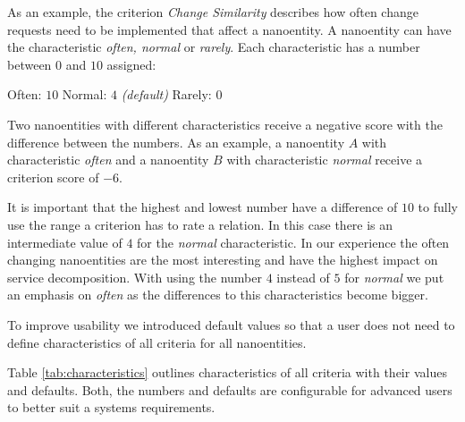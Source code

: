 As an example, the criterion \textit{Change Similarity} describes how often change requests need to be implemented that affect a nanoentity. A nanoentity can have the characteristic \textit{often, normal} or \textit{rarely}. Each characteristic has a number between $0$ and $10$ assigned:

Often: $10$ \newline
Normal: $4$ \textit{(default)} \newline
Rarely: $0$ \newline

Two nanoentities with different characteristics receive a negative score with the difference between the numbers. As an example, a nanoentity $A$ with characteristic \textit{often} and a nanoentity $B$ with characteristic \textit{normal} receive a criterion score of $-6$. 

It is important that the highest and lowest number have a difference of $10$ to fully use the range a criterion has to rate a relation. \newline In this case there is an intermediate value of $4$ for the \textit{normal} characteristic. In our experience the often changing nanoentities are the most interesting and have the highest impact on service decomposition. With using the number $4$ instead of $5$ for \textit{normal} we put an emphasis on \textit{often} as the differences to this characteristics become bigger. 

To improve usability we introduced default values so that a user does not need to define characteristics of all criteria for all nanoentities. 

Table \ref{tab:characteristics} outlines characteristics of all criteria with their values and defaults. Both, the numbers and defaults are configurable for advanced users to better suit a systems requirements. 

